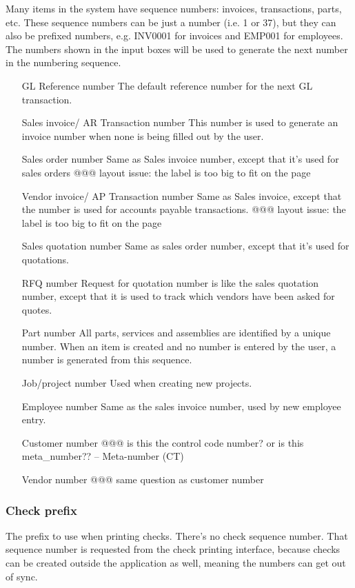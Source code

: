 Many items in the system have sequence numbers: invoices, transactions, parts, etc. These sequence numbers can be just a number (i.e. 1 or 37),
but they can also be prefixed numbers, e.g. INV0001 for invoices and EMP001 for employees.
The numbers shown in the input boxes will be used to generate the next number in the
numbering sequence.
\begin{itemize}
\item [GL Reference number] The default reference number for the next GL
transaction.
\item [Sales invoice/ AR Transaction number] This number is used to generate an invoice
number when none is being filled out by the user.
\item [Sales order number] Same as Sales invoice number, except that it's used for sales orders @@@ layout issue: the label is too big to fit on the page
\item [Vendor invoice/ AP Transaction number] Same as Sales invoice, except that the number
is used for accounts payable transactions. @@@ layout issue: the label is too big to fit on the page
\item [Sales quotation number] Same as sales order number, except that it's used for quotations.
\item [RFQ number] Request for quotation number is like the sales quotation number, except
that it is used to track which vendors have been asked for quotes.
\item [Part number] All parts, services and assemblies are identified by a unique number.
When an item is created and no number is entered by the user, a number is generated
from this sequence.
\item [Job/project number] Used when creating new projects.
\item [Employee number] Same as the sales invoice number, used by new employee entry.
\item [Customer number] @@@ is this the control code number? or is this
meta\_number?? -- Meta-number (CT)
\item [Vendor number] @@@ same question as customer number
\end{itemize}

\subsubsection{Check prefix} The prefix to use when printing checks. There's no check sequence number. That sequence number is requested from the check printing interface, because
checks can be created outside the application as well, meaning the numbers can
get out of sync.

